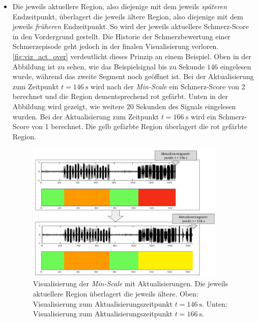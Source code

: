 \begin{itemize}
\item Die jeweils \glqq aktuellere\grqq{} Region, also diejenige mit dem jeweils \emph{späteren} Endzeitpunkt, überlagert die jeweils \glqq ältere\grqq{} Region, also diejenige mit dem jeweils \emph{früheren} Endzeitpunkt. So wird der jeweils aktuellere Schmerz-Score in den Vordergrund gestellt. Die Historie der Schmerzbewertung einer Schmerzepisode geht jedoch in der finalen Visualisierung verloren. \autoref{fig:viz_act_over} verdeutlicht dieses Prinzip an einem Beispiel. Oben in der Abbildung ist zu sehen, wie das Beispielsignal bis zu Sekunde $146$ eingelesen wurde, während das zweite Segment noch geöffnet ist. Bei der Aktualisierung zum Zeitpunkt $t=\SI{146}{\second}$ wird nach der \emph{Min-Scale} ein Schmerz-Score von 2 berechnet und die Region dementsprechend rot gefärbt. Unten in der Abbildung wird gezeigt, wie weitere 20 Sekunden des Signals eingelesen wurden. Bei der Aktualisierung zum Zeitpunkt $t=\SI{166}{\second}$ wird ein Schmerz-Score von 1 berechnet. Die gelb gefärbte Region überlagert die rot gefärbte Region.

\begin{figure}[h]
	\centering
	\includegraphics[width=0.9\textwidth]{bilder/viz_act_over_03.png}
	\caption[Visualisierung der bei Aktualisierungen mit Priorisierung der aktuelleren Schmerzbewertung]{Visualisierung der \emph{Min-Scale} mit Aktualisierungen. Die jeweils \glqq aktuellere\grqq{} Region überlagert die jeweils \glqq ältere\grqq{}. Oben: Visualisierung zum Aktualisierungszeitpunkt $t=\SI{146}{\second}$. Unten: Visualisierung zum Aktualisierungszeitpunkt $t=\SI{166}{\second}$.}
	\label{fig:viz_act_over}
\end{figure}


\end{itemize}
